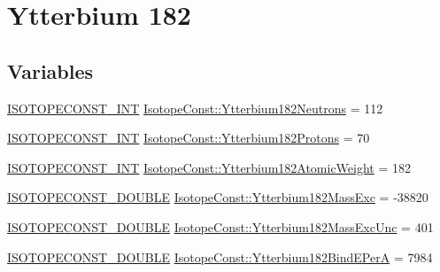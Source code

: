 \hypertarget{group___isotope_const-_ytterbium-_yb182}{}\section{Ytterbium 182}
\label{group___isotope_const-_ytterbium-_yb182}
\subsection*{Variables}
\begin{DoxyCompactItemize}
\item 
\mbox{\hyperlink{group___isotope_const-_macros_ga5f18360b3e99483a35c32d789e62621c}{I\+S\+O\+T\+O\+P\+E\+C\+O\+N\+S\+T\+\_\+\+I\+NT}} \mbox{\hyperlink{group___isotope_const-_ytterbium-_yb182_gae7527bef6dedfffea9e974b1bab831fd}{Isotope\+Const\+::\+Ytterbium182\+Neutrons}} = 112
\item 
\mbox{\hyperlink{group___isotope_const-_macros_ga5f18360b3e99483a35c32d789e62621c}{I\+S\+O\+T\+O\+P\+E\+C\+O\+N\+S\+T\+\_\+\+I\+NT}} \mbox{\hyperlink{group___isotope_const-_ytterbium-_yb182_ga1b5f9933e942f8bd7df63d4b0b1b737f}{Isotope\+Const\+::\+Ytterbium182\+Protons}} = 70
\item 
\mbox{\hyperlink{group___isotope_const-_macros_ga5f18360b3e99483a35c32d789e62621c}{I\+S\+O\+T\+O\+P\+E\+C\+O\+N\+S\+T\+\_\+\+I\+NT}} \mbox{\hyperlink{group___isotope_const-_ytterbium-_yb182_gafb574b1ec0a91bf252fd65ff3d1147e5}{Isotope\+Const\+::\+Ytterbium182\+Atomic\+Weight}} = 182
\item 
\mbox{\hyperlink{group___isotope_const-_macros_ga8f45a7272ce02c0b4c65c44636ed719a}{I\+S\+O\+T\+O\+P\+E\+C\+O\+N\+S\+T\+\_\+\+D\+O\+U\+B\+LE}} \mbox{\hyperlink{group___isotope_const-_ytterbium-_yb182_ga1ab03c64c18a8cf325e120ad5af5adf2}{Isotope\+Const\+::\+Ytterbium182\+Mass\+Exc}} = -\/38820
\item 
\mbox{\hyperlink{group___isotope_const-_macros_ga8f45a7272ce02c0b4c65c44636ed719a}{I\+S\+O\+T\+O\+P\+E\+C\+O\+N\+S\+T\+\_\+\+D\+O\+U\+B\+LE}} \mbox{\hyperlink{group___isotope_const-_ytterbium-_yb182_ga4510aca4ad5afcd95436fcb20fbb6d40}{Isotope\+Const\+::\+Ytterbium182\+Mass\+Exc\+Unc}} = 401
\item 
\mbox{\hyperlink{group___isotope_const-_macros_ga8f45a7272ce02c0b4c65c44636ed719a}{I\+S\+O\+T\+O\+P\+E\+C\+O\+N\+S\+T\+\_\+\+D\+O\+U\+B\+LE}} \mbox{\hyperlink{group___isotope_const-_ytterbium-_yb182_ga3500d2529510262ee9c01629a58f8f9e}{Isotope\+Const\+::\+Ytterbium182\+Bind\+E\+PerA}} = 7984
\item 

\end{DoxyCompactItemize}
